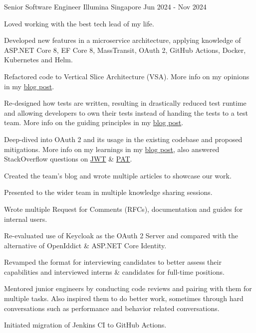 \begin{cventries}
\cventry
{Senior Software Engineer} %
{Illumina} %
{Singapore} %
{Jun 2024 - Nov 2024} %
{
  \begin{cvitems} %
    \item {Loved working with the best tech lead of my life.}
    \item {Developed new features in a microservice architecture, applying knowledge of ASP.NET Core 8, EF Core 8, MassTransit, OAuth 2, GitHub Actions, Docker, Kubernetes and Helm.}
    \item {Refactored code to Vertical Slice Architecture (VSA). More info on my opinions in my \href{https://bit.ly/zy-vsa}{blog post}.}
    \item {Re-designed how tests are written, resulting in drastically reduced test runtime and allowing developers to own their tests instead of handing the tests to a test team. More info on the guiding principles in my \href{https://bit.ly/zy-tests}{blog post}.}
    \item {Deep-dived into OAuth 2 and its usage in the existing codebase and proposed mitigations. More info on my learnings in my \href{https://bit.ly/zy-oauth2}{blog post}, also answered StackOverflow questions on \href{https://bit.ly/zy-jwt}{JWT} \& \href{https://bit.ly/zy-pat}{PAT}.}
    \item {Created the team's blog and wrote multiple articles to showcase our work.}
    \item {Presented to the wider team in multiple knowledge sharing sessions.}
    \item {Wrote multiple Request for Comments (RFCs), documentation and guides for internal users.}
    \item {Re-evaluated use of Keycloak as the OAuth 2 Server and compared with the alternative of OpenIddict \& ASP.NET Core Identity.}
    \item {Revamped the format for interviewing candidates to better assess their capabilities and interviewed interns \& candidates for full-time positions.}
    \item {Mentored junior engineers by conducting code reviews and pairing with them for multiple tasks. Also inspired them to do better work, sometimes through hard conversations such as performance and behavior related conversations.}
    \item {Initiated migration of Jenkins CI to GitHub Actions.}
  \end{cvitems}
}


\end{cventries}
